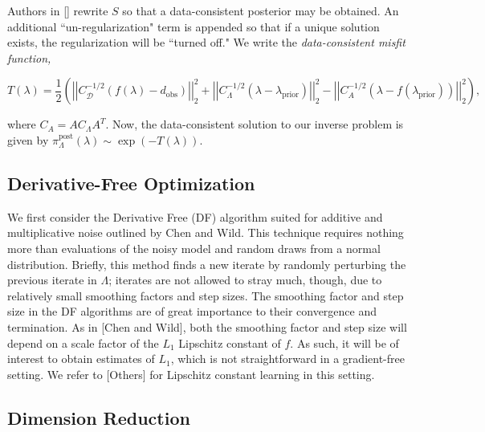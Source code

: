 \documentclass{amsart}
\begin{document}
Authors in [] rewrite $S$ so that a data-consistent posterior may be obtained. An additional ``un-regularization" term is appended so that if a unique solution exists, the regularization will be ``turned off." We write the \textit{data-consistent misfit function,}




\begin{equation} \label{eq:3}
T(\lambda)=\frac{1}{2}\left(\left|\left|C_\mathcal{D}^{-1/2}(f(\lambda)-d_{\text{obs}})\right|\right|_2^2+\left|\left|C_\Lambda^{-1/2}(\lambda-\lambda_{\text{prior}})\right|\right|_2^2-\left|\left|C_A^{-1/2}(\lambda-f(\lambda_{\text{prior}}))\right|\right|_2^2\right),
\end{equation} 

\noindent where $C_A=AC_\Lambda A^T$. Now, the data-consistent solution to our inverse problem is given by $\pi_\Lambda^\text{post}(\lambda)\sim \exp(-T(\lambda))$.






\subsection{Derivative-Free Optimization}


We first consider the Derivative Free (DF) algorithm suited for additive and multiplicative noise outlined by Chen and Wild. This technique requires nothing more than evaluations of the noisy model and random draws from a normal distribution. Briefly, this method finds a new iterate by randomly perturbing the previous iterate in $\Lambda$; iterates are not allowed to stray much, though, due to relatively small smoothing factors and step sizes. The smoothing factor and step size in the DF algorithms are of great importance to their convergence and termination. As in [Chen and Wild], both the smoothing factor and step size will depend on a scale factor of the $L_1$ Lipschitz constant of $f$. As such, it will be of interest to obtain estimates of $L_1$, which is not straightforward in a gradient-free setting. We refer to [Others] for Lipschitz constant learning in this setting. 

\subsection{Dimension Reduction}
\end{document}
